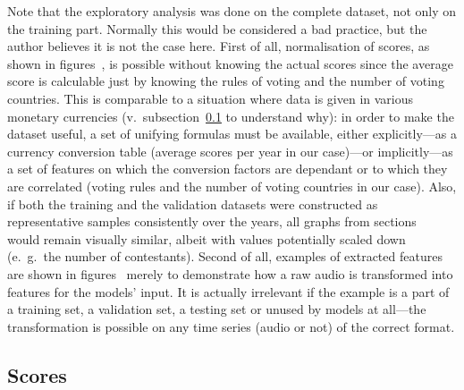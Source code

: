 \documentclass[conference, a4paper, 12pt]{IEEEtran}
\begin{document}
    Note that the exploratory analysis was done on the complete dataset, not only on the training part. Normally this would be considered a bad practice, but the author believes it is not the case here. First of all, normalisation of scores, as shown in figures~, is possible without knowing the actual scores since the average score is calculable just by knowing the rules of voting and the number of voting countries. This is comparable to a situation where data is given in various monetary currencies (v.\ subsection~\ref{subsec:scores} to understand why): in order to make the dataset useful, a set of unifying formulas must be available, either explicitly---as a currency conversion table (average scores per year in our case)---or implicitly---as a set of features on which the conversion factors are dependant or to which they are correlated (voting rules and the number of voting countries in our case). Also, if both the training and the validation datasets were constructed as representative samples consistently over the years, all graphs from sections~ would remain visually similar, albeit with values potentially scaled down (e.~g.\ the number of contestants). Second of all, examples of extracted features are shown in figures~ merely to demonstrate how a raw audio is transformed into features for the models' input. It is actually irrelevant if the example is a part of a training set, a validation set, a testing set or unused by models at all---the transformation is possible on any time series (audio or not) of the correct format.

    \par

    \subsection{Scores}
    \label{subsec:scores}
\end{document}
